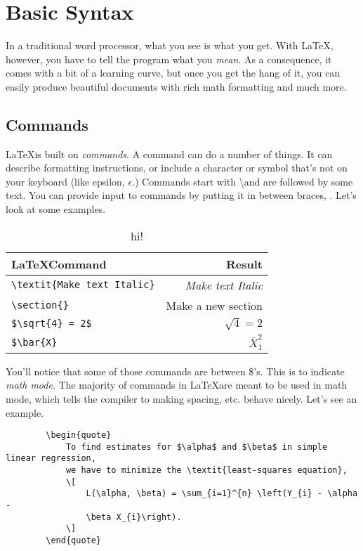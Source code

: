 \documentclass[12pt]{article}
\begin{document}
	
	\section{Basic Syntax}
	
	In a traditional word processor, what you see is what you get. With \LaTeX, however, you have to tell the program what you \textit{mean}. As a consequence, it comes with a bit of a learning curve, but once you get the hang of it, you can easily produce beautiful documents with rich math formatting and much more.
	
	\subsection{Commands}
	
	\LaTeX is built on \textit{commands}. A command can do a number of things. It can describe formatting instructions, or include a character or symbol that's not on your keyboard (like epsilon, $\epsilon$.) Commands start with \textbackslash and are followed by some text. You can provide input to commands by putting it in between braces, \textbraceleft \textbraceright. Let's look at some examples.
	
	\begin{table}[H]
		\centering
		\caption{hi!}
		\begin{tabular}{l|r}
			\textbf{\LaTeX Command} & \textbf{Result} \\ \hline
			\verb|\textit{Make text Italic}| & \textit{Make text Italic} \\
			\verb|\section{}| & Make a new section \\
			\verb|$\sqrt{4} = 2$| & $\sqrt{4} = 2$ \\ 
			\verb|$\bar{X}| & $\bar{X}^{2}_{1}$
		\end{tabular}
	\end{table}
	
	You'll notice that some of those commands are between \$'s. This is to indicate \textit{math mode}. The majority of commands in \LaTeX are meant to be used in math mode, which tells the compiler to making spacing, etc. behave nicely. Let's see an example.
	
	\begin{verbatim}
		\begin{quote}
		    To find estimates for $\alpha$ and $\beta$ in simple linear regression, 
		    we have to minimize the \textit{least-squares equation},
	    	\[
	            L(\alpha, \beta) = \sum_{i=1}^{n} \left(Y_{i} - \alpha - 
	            \beta X_{i}\right).
		    \]
		\end{quote}
	\end{verbatim}
	
\end{document}

